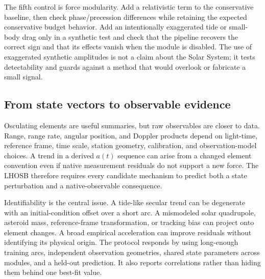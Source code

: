 \documentclass[10pt,conference]{IEEEtran}
\begin{document}
The fifth control is force modularity. Add a relativistic term to the conservative baseline, then check phase/precession differences while retaining the expected conservative budget behavior. Add an intentionally exaggerated tide or small-body drag only in a synthetic test and check that the pipeline recovers the correct sign and that its effects vanish when the module is disabled. The use of exaggerated synthetic amplitudes is not a claim about the Solar System; it tests detectability and guards against a method that would overlook or fabricate a small signal.

\subsection{From state vectors to observable evidence}

Osculating elements are useful summaries, but raw observables are closer to data. Range, range rate, angular position, and Doppler products depend on light-time, reference frame, time scale, station geometry, calibration, and observation-model choices. A trend in a derived $a(t)$ sequence can arise from a changed element convention even if native measurement residuals do not support a new force. The LHOSB therefore requires every candidate mechanism to predict both a state perturbation and a native-observable consequence.

Identifiability is the central issue. A tide-like secular trend can be degenerate with an initial-condition offset over a short arc. A mismodeled solar quadrupole, asteroid mass, reference-frame transformation, or tracking bias can project onto element changes. A broad empirical acceleration can improve residuals without identifying its physical origin. The protocol responds by using long-enough training arcs, independent observation geometries, shared state parameters across modules, and a held-out prediction. It also reports correlations rather than hiding them behind one best-fit value.
\end{document}
